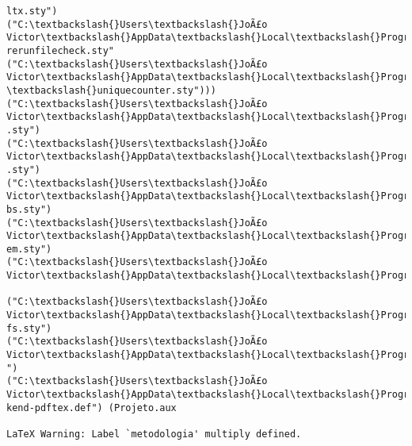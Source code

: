 \documentclass[11pt]{article}
\begin{document}
\begin{Verbatim}[commandchars=\\\{\}]
ltx.sty")
("C:\textbackslash{}Users\textbackslash{}JoÃ£o Victor\textbackslash{}AppData\textbackslash{}Local\textbackslash{}Programs\textbackslash{}MiKTeX\textbackslash{}tex/latex/rerunfilecheck\textbackslash{}
rerunfilecheck.sty"
("C:\textbackslash{}Users\textbackslash{}JoÃ£o Victor\textbackslash{}AppData\textbackslash{}Local\textbackslash{}Programs\textbackslash{}MiKTeX\textbackslash{}tex/generic/uniquecounter
\textbackslash{}uniquecounter.sty")))
("C:\textbackslash{}Users\textbackslash{}JoÃ£o Victor\textbackslash{}AppData\textbackslash{}Local\textbackslash{}Programs\textbackslash{}MiKTeX\textbackslash{}tex/latex/titling\textbackslash{}titling
.sty")
("C:\textbackslash{}Users\textbackslash{}JoÃ£o Victor\textbackslash{}AppData\textbackslash{}Local\textbackslash{}Programs\textbackslash{}MiKTeX\textbackslash{}tex/latex/tools\textbackslash{}longtable
.sty")
("C:\textbackslash{}Users\textbackslash{}JoÃ£o Victor\textbackslash{}AppData\textbackslash{}Local\textbackslash{}Programs\textbackslash{}MiKTeX\textbackslash{}tex/latex/booktabs\textbackslash{}bookta
bs.sty")
("C:\textbackslash{}Users\textbackslash{}JoÃ£o Victor\textbackslash{}AppData\textbackslash{}Local\textbackslash{}Programs\textbackslash{}MiKTeX\textbackslash{}tex/latex/enumitem\textbackslash{}enumit
em.sty")
("C:\textbackslash{}Users\textbackslash{}JoÃ£o Victor\textbackslash{}AppData\textbackslash{}Local\textbackslash{}Programs\textbackslash{}MiKTeX\textbackslash{}tex/latex/ulem\textbackslash{}ulem.sty")

("C:\textbackslash{}Users\textbackslash{}JoÃ£o Victor\textbackslash{}AppData\textbackslash{}Local\textbackslash{}Programs\textbackslash{}MiKTeX\textbackslash{}tex/latex/jknappen\textbackslash{}mathrs
fs.sty")
("C:\textbackslash{}Users\textbackslash{}JoÃ£o Victor\textbackslash{}AppData\textbackslash{}Local\textbackslash{}Programs\textbackslash{}MiKTeX\textbackslash{}tex/latex/psnfss\textbackslash{}t1ppl.fd
")
("C:\textbackslash{}Users\textbackslash{}JoÃ£o Victor\textbackslash{}AppData\textbackslash{}Local\textbackslash{}Programs\textbackslash{}MiKTeX\textbackslash{}tex/latex/l3backend\textbackslash{}l3bac
kend-pdftex.def") (Projeto.aux

LaTeX Warning: Label `metodologia' multiply defined.


\end{Verbatim}
\end{document}
